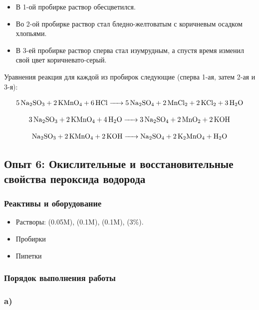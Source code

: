 \documentclass[a4paper, 12pt]{article}
\begin{document}
\begin{itemize}
	\item В 1-ой пробирке раствор обесцветился.
	
	\item Во 2-ой пробирке раствор стал бледно-желтоватым с коричневым осадком хлопьями.
	
	\item В 3-ей пробирке раствор сперва стал изумрудным, а спустя время изменил свой цвет коричневато-серый.
\end{itemize}

Уравнения реакция для каждой из пробирок следующие (сперва 1-ая, затем 2-ая и 3-я):

\begin{equation}
	\ce{5Na2SO3 + 2KMnO4 + 6HCl -> 5Na2SO4 + 2MnCl2 + 2KCl2 + 3H2O}
\end{equation}

\begin{equation}
	\ce{3Na2SO3 + 2KMnO4 + 4H2O -> 3Na2SO4 + 2MnO2 + 2KOH}
\end{equation}

\begin{equation}
	\ce{Na2SO3 + 2KMnO4 + 2KOH -> Na2SO4 + 2K2MnO4 + H2O}
\end{equation}

\subsection{Опыт 6: Окислительные и восстановительные свойства пероксида водорода}

\subsubsection{Реактивы и оборудование}

\begin{itemize}
	\item Растворы:  (0.05M),  (0.1M),  (0.1M),  (3\%).
	
	\item Пробирки
	
	\item Пипетки
\end{itemize}

\subsubsection{Порядок выполнения работы}

\subsubsection*{a)}
\end{document}
